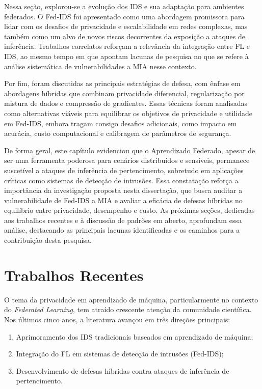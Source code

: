 \documentclass[
	12pt,				%
	openright,			%
	oneside,			%
	a4paper,			%
	english,			%
	french,				%
	spanish,			%
	brazil,				%
	]{abntex2}
\begin{document}
Nessa seção, explorou-se a evolução dos IDS e sua adaptação para ambientes federados. O Fed-IDS foi apresentado como uma abordagem promissora para lidar com os desafios de privacidade e escalabilidade em redes complexas, mas também como um alvo de novos riscos decorrentes da exposição a ataques de inferência. Trabalhos correlatos reforçam a relevância da integração entre FL e IDS, ao mesmo tempo em que apontam lacunas de pesquisa no que se refere à análise sistemática de vulnerabilidades a MIA nesse contexto.

Por fim, foram discutidas as principais estratégias de defesa, com ênfase em abordagens híbridas que combinam privacidade diferencial, regularização por mistura de dados e compressão de gradientes. Essas técnicas foram analisadas como alternativas viáveis para equilibrar os objetivos de privacidade e utilidade em Fed-IDS, embora tragam consigo desafios adicionais, como impacto em acurácia, custo computacional e calibragem de parâmetros de segurança.

De forma geral, este capítulo evidenciou que o Aprendizado Federado, apesar de ser uma ferramenta poderosa para cenários distribuídos e sensíveis, permanece suscetível a ataques de inferência de pertencimento, sobretudo em aplicações críticas como sistemas de detecção de intrusões. Essa constatação reforça a importância da investigação proposta nesta dissertação, que busca auditar a vulnerabilidade de Fed-IDS a MIA e avaliar a eficácia de defesas híbridas no equilíbrio entre privacidade, desempenho e custo. As próximas seções, dedicadas aos trabalhos recentes e à discussão de padrões em aberto, aprofundam essa análise, destacando as principais lacunas identificadas e os caminhos para a contribuição desta pesquisa.

\section{Trabalhos Recentes}
\label{sec:trabalhos_recentes}

O tema da privacidade em aprendizado de máquina, particularmente no contexto do \textit{Federated Learning}, tem atraído crescente atenção da comunidade científica. Nos últimos cinco anos, a literatura avançou em três direções principais:
\begin{enumerate}[label=(\Roman*)]
    \item Aprimoramento dos IDS tradicionais baseados em aprendizado de máquina;
    \item Integração do FL em sistemas de detecção de intrusões (Fed-IDS);
    \item Desenvolvimento de defesas híbridas contra ataques de inferência de pertencimento.
\end{enumerate}
\end{document}
